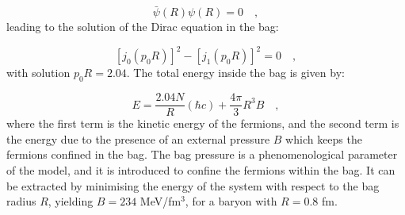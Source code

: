 \begin{equation*}
    \bar{\psi}(R)\psi(R) = 0\quad ,
\end{equation*}
leading to the solution of the Dirac equation in the bag:

\begin{equation*}
    \left[j_0\left(p_0R\right)\right]^2 - \left[j_1\left(p_0R\right)\right]^2 = 0\quad ,
\end{equation*}
with solution $p_0R = 2.04$. The total energy inside the bag is given by:

\begin{equation*}
    E = \frac{2.04 N}{R}(\hbar c) + \frac{4\pi}{3}R^3B\quad ,
\end{equation*}
where the first term is the kinetic energy of the fermions, and the second term is the energy due to the presence of an external pressure $B$ which keeps the fermions confined in the bag. The bag pressure is a phenomenological parameter of the model, and it is introduced to confine the fermions within the bag. It can be extracted by minimising the energy of the system with respect to the bag radius $R$, yielding $B=234$ MeV/fm$^3$, for a baryon with $R=0.8$ fm.


